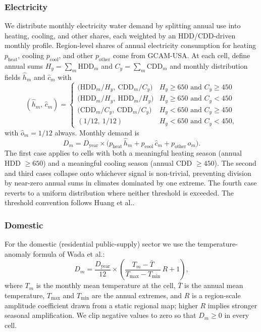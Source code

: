 \documentclass[fleqn,10pt]{wlscirep}
\begin{document}
\subsubsection*{Electricity}

We distribute monthly electricity water demand by splitting annual use into heating, cooling, and other shares, each weighted by an HDD/CDD-driven monthly profile. Region-level shares of annual electricity consumption for heating $p_{\mathrm{heat}}$, cooling $p_{\mathrm{cool}}$, and other $p_{\mathrm{other}}$ come from GCAM-USA. At each cell, define annual sums $H_y = \sum_m \text{HDD}_m$ and $C_y = \sum_m \text{CDD}_m$ and monthly distribution fields $\hat{h}_m$ and $\hat{c}_m$ with
\begin{equation}
(\hat{h}_m,\,\hat{c}_m) =
\begin{cases}
\big(\text{HDD}_m / H_y,\ \text{CDD}_m / C_y\big)      & H_y \ge 650 \text{ and } C_y \ge 450 \\[2pt]
\big(\text{HDD}_m / H_y,\ \text{HDD}_m / H_y\big)      & H_y \ge 650 \text{ and } C_y < 450 \\[2pt]
\big(\text{CDD}_m / C_y,\ \text{CDD}_m / C_y\big)      & H_y < 650 \text{ and } C_y \ge 450 \\[2pt]
(1/12,\ 1/12)                                          & H_y < 650 \text{ and } C_y < 450,
\end{cases}
\label{eq:elec-cases}
\end{equation}
with $\hat{o}_m = 1/12$ always. Monthly demand is
\begin{equation}
D_m = D_{\mathrm{year}} \times \big(p_{\mathrm{heat}}\,\hat{h}_m + p_{\mathrm{cool}}\,\hat{c}_m + p_{\mathrm{other}}\,\hat{o}_m\big).
\label{eq:elec-demand}
\end{equation}
The first case applies to cells with both a meaningful heating season (annual HDD $\ge 650$) and a meaningful cooling season (annual CDD $\ge 450$). The second and third cases collapse onto whichever signal is non-trivial, preventing division by near-zero annual sums in climates dominated by one extreme. The fourth case reverts to a uniform distribution where neither threshold is exceeded. The threshold convention follows Huang et al.\cite{Huang2018}.

\subsubsection*{Domestic}

For the domestic (residential public-supply) sector we use the temperature-anomaly formula of Wada et al.\cite{Wada2011}:
\begin{equation}
D_m = \frac{D_{\mathrm{year}}}{12} \times \left(\frac{T_m - \bar{T}}{T_{\max} - T_{\min}}\,R + 1\right),
\label{eq:dom-monthly}
\end{equation}
where $T_m$ is the monthly mean temperature at the cell, $\bar{T}$ is the annual mean temperature, $T_{\max}$ and $T_{\min}$ are the annual extremes, and $R$ is a region-scale amplitude coefficient drawn from a static regional map; higher $R$ implies stronger seasonal amplification. We clip negative values to zero so that $D_m \ge 0$ in every cell.
\end{document}
